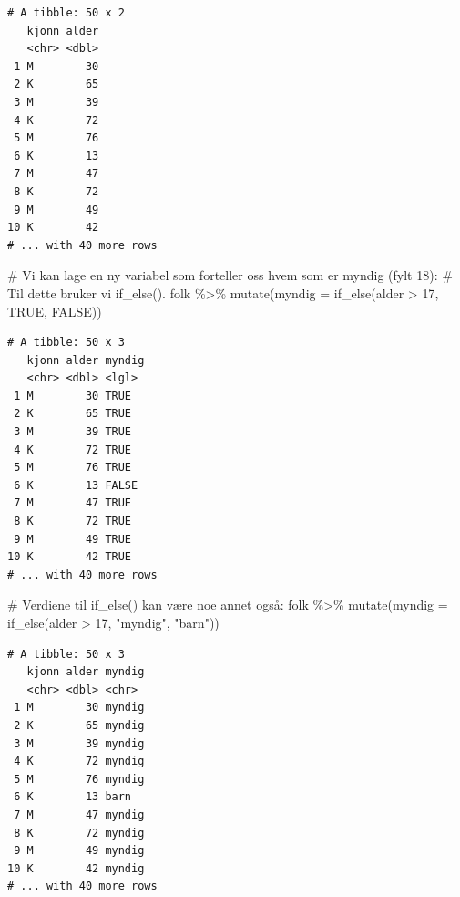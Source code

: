 \documentclass[
  letterpaper,
  DIV=11,
  numbers=noendperiod]{scrreprt}
\newenvironment{Shaded}{\begin{snugshade}}{\end{snugshade}}
\newcommand{\AttributeTok}[1]{\textcolor[rgb]{0.40,0.45,0.13}{#1}}
\newcommand{\CommentTok}[1]{\textcolor[rgb]{0.37,0.37,0.37}{#1}}
\newcommand{\ConstantTok}[1]{\textcolor[rgb]{0.56,0.35,0.01}{#1}}
\newcommand{\DecValTok}[1]{\textcolor[rgb]{0.68,0.00,0.00}{#1}}
\newcommand{\FunctionTok}[1]{\textcolor[rgb]{0.28,0.35,0.67}{#1}}
\newcommand{\NormalTok}[1]{\textcolor[rgb]{0.00,0.23,0.31}{#1}}
\newcommand{\SpecialCharTok}[1]{\textcolor[rgb]{0.37,0.37,0.37}{#1}}
\newcommand{\StringTok}[1]{\textcolor[rgb]{0.13,0.47,0.30}{#1}}
\begin{document}
\begin{verbatim}
# A tibble: 50 x 2
   kjonn alder
   <chr> <dbl>
 1 M        30
 2 K        65
 3 M        39
 4 K        72
 5 M        76
 6 K        13
 7 M        47
 8 K        72
 9 M        49
10 K        42
# ... with 40 more rows
\end{verbatim}

\begin{Shaded}
\begin{Highlighting}[]
\CommentTok{\# Vi kan lage en ny variabel som forteller oss hvem som er myndig (fylt 18):}
\CommentTok{\# Til dette bruker vi \textasciigrave{}if\_else()\textasciigrave{}. }
\NormalTok{folk }\SpecialCharTok{\%\textgreater{}\%} 
  \FunctionTok{mutate}\NormalTok{(}\AttributeTok{myndig =} \FunctionTok{if\_else}\NormalTok{(alder }\SpecialCharTok{\textgreater{}} \DecValTok{17}\NormalTok{, }\ConstantTok{TRUE}\NormalTok{, }\ConstantTok{FALSE}\NormalTok{))}
\end{Highlighting}
\end{Shaded}

\begin{verbatim}
# A tibble: 50 x 3
   kjonn alder myndig
   <chr> <dbl> <lgl> 
 1 M        30 TRUE  
 2 K        65 TRUE  
 3 M        39 TRUE  
 4 K        72 TRUE  
 5 M        76 TRUE  
 6 K        13 FALSE 
 7 M        47 TRUE  
 8 K        72 TRUE  
 9 M        49 TRUE  
10 K        42 TRUE  
# ... with 40 more rows
\end{verbatim}

\begin{Shaded}
\begin{Highlighting}[]
\CommentTok{\# Verdiene til \textasciigrave{}if\_else()\textasciigrave{} kan være noe annet også:}
\NormalTok{folk }\SpecialCharTok{\%\textgreater{}\%} 
  \FunctionTok{mutate}\NormalTok{(}\AttributeTok{myndig =} \FunctionTok{if\_else}\NormalTok{(alder }\SpecialCharTok{\textgreater{}} \DecValTok{17}\NormalTok{, }\StringTok{"myndig"}\NormalTok{, }\StringTok{"barn"}\NormalTok{))}
\end{Highlighting}
\end{Shaded}

\begin{verbatim}
# A tibble: 50 x 3
   kjonn alder myndig
   <chr> <dbl> <chr> 
 1 M        30 myndig
 2 K        65 myndig
 3 M        39 myndig
 4 K        72 myndig
 5 M        76 myndig
 6 K        13 barn  
 7 M        47 myndig
 8 K        72 myndig
 9 M        49 myndig
10 K        42 myndig
# ... with 40 more rows
\end{verbatim}
\end{document}

